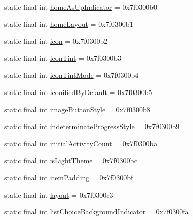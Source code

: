 \begin{DoxyCompactItemize}
\item 
static final int \mbox{\hyperlink{classandroid_1_1support_1_1v7_1_1appcompat_1_1R_1_1attr_a29f06cbfa3eb9526975250ade81dade5}{home\+As\+Up\+Indicator}} = 0x7f0300b0
\item 
static final int \mbox{\hyperlink{classandroid_1_1support_1_1v7_1_1appcompat_1_1R_1_1attr_a0eb473a3dd928bba368900667c203cc1}{home\+Layout}} = 0x7f0300b1
\item 
static final int \mbox{\hyperlink{classandroid_1_1support_1_1v7_1_1appcompat_1_1R_1_1attr_a760a18e31f16c4508d2b044b6ddf8f18}{icon}} = 0x7f0300b2
\item 
static final int \mbox{\hyperlink{classandroid_1_1support_1_1v7_1_1appcompat_1_1R_1_1attr_a2a291819286ee3463790dc7b79501ac1}{icon\+Tint}} = 0x7f0300b3
\item 
static final int \mbox{\hyperlink{classandroid_1_1support_1_1v7_1_1appcompat_1_1R_1_1attr_a3798696d59e9d820a50f17a9099e5df7}{icon\+Tint\+Mode}} = 0x7f0300b4
\item 
static final int \mbox{\hyperlink{classandroid_1_1support_1_1v7_1_1appcompat_1_1R_1_1attr_aa4ac7a86dce6917cc2b82fb3ff0ec91c}{iconified\+By\+Default}} = 0x7f0300b5
\item 
static final int \mbox{\hyperlink{classandroid_1_1support_1_1v7_1_1appcompat_1_1R_1_1attr_ae6cb67b0d2b193ad62982dd7ebfc8cd2}{image\+Button\+Style}} = 0x7f0300b8
\item 
static final int \mbox{\hyperlink{classandroid_1_1support_1_1v7_1_1appcompat_1_1R_1_1attr_a7ccf7bdae61fca08bef72600f4fb70bb}{indeterminate\+Progress\+Style}} = 0x7f0300b9
\item 
static final int \mbox{\hyperlink{classandroid_1_1support_1_1v7_1_1appcompat_1_1R_1_1attr_af7e4f93600e0713be671334dc7ec8676}{initial\+Activity\+Count}} = 0x7f0300ba
\item 
static final int \mbox{\hyperlink{classandroid_1_1support_1_1v7_1_1appcompat_1_1R_1_1attr_a7977bfc92e0cda3d33e12833fd72db80}{is\+Light\+Theme}} = 0x7f0300bc
\item 
static final int \mbox{\hyperlink{classandroid_1_1support_1_1v7_1_1appcompat_1_1R_1_1attr_a39f698094b1d9f497799e81850def158}{item\+Padding}} = 0x7f0300bf
\item 
static final int \mbox{\hyperlink{classandroid_1_1support_1_1v7_1_1appcompat_1_1R_1_1attr_a4fe736a4576409d2d17038ba5dc0f33b}{layout}} = 0x7f0300c3
\item 
static final int \mbox{\hyperlink{classandroid_1_1support_1_1v7_1_1appcompat_1_1R_1_1attr_a6bc5f753853d9121d0ea7f85b6687258}{list\+Choice\+Background\+Indicator}} = 0x7f0300fa

\end{DoxyCompactItemize}
